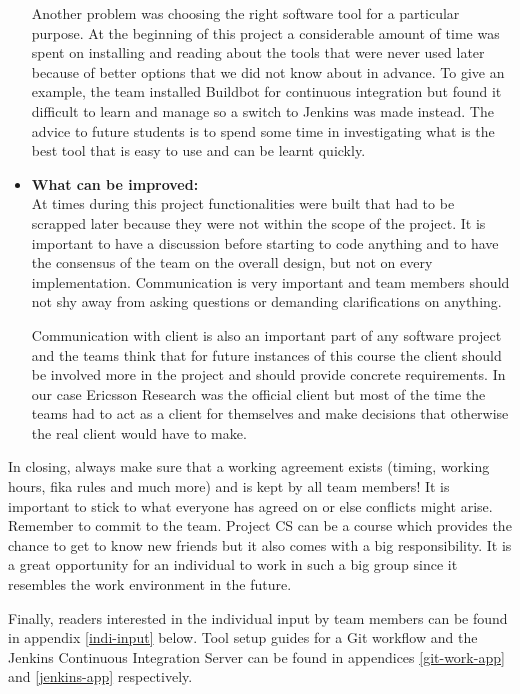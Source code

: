 \begin{itemize}
Another problem was choosing the right software tool for a particular purpose. At the 
beginning of this project a considerable amount of time was spent on installing and reading about the tools that were never 
used later because of better options that we did not know about in advance. To give an example, the team installed Buildbot for continuous integration but found 
it difficult to learn and manage so a switch to Jenkins was made instead. The advice to future students is to 
spend some time in investigating what is the best tool that is easy to use and can be learnt quickly.

\item{\textbf{What can be improved:}}\\
 At times during this project functionalities were built that had to be scrapped later because they were not 
 within the scope of the project. It is important to have a discussion before starting to code anything 
 and to have the consensus of the team on the overall design, but not on every implementation. Communication is very important and team members should not shy away from asking 
 questions or demanding clarifications on anything.  
 
Communication with client is also an important part of any software project and the teams think that 
for future instances of this course the client should be involved more in the project and should 
provide concrete requirements. In our case Ericsson Research was the official client 
but most of the time the teams had to act as a client for themselves and make decisions that otherwise the real 
client would have to make. 
\end{itemize}


In closing, always make sure that a working agreement exists (timing, working hours, fika rules and much more) and
is kept by all team members! It is important to stick to what everyone has agreed on or else
conflicts might arise. 
Remember to commit to the team. Project CS can be a course which provides the chance to get to know new friends but it also comes with a big responsibility.
It is a great opportunity for an individual to work in such a big group since
it resembles the work environment in the future.

Finally, readers interested in the individual input by team members can be found in appendix \ref{indi-input} below. Tool setup guides for a Git workflow and the Jenkins Continuous Integration Server can be found in appendices \ref{git-work-app} and \ref{jenkins-app} respectively.
